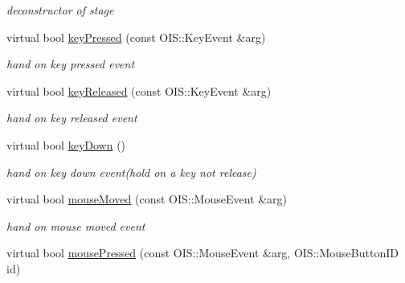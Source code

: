\begin{DoxyCompactItemize}
\begin{DoxyCompactList}\small\item\em deconstructor of stage \end{DoxyCompactList}\item 
\hypertarget{class_stage4_a4fc3efa617bb187f164423139d5501a6}{
virtual bool \hyperlink{class_stage4_a4fc3efa617bb187f164423139d5501a6}{keyPressed} (const OIS::KeyEvent \&arg)}
\label{class_stage4_a4fc3efa617bb187f164423139d5501a6}

\begin{DoxyCompactList}\small\item\em hand on key pressed event \end{DoxyCompactList}\item 
\hypertarget{class_stage4_a3bf5cfd207ce38f2c5d8d00e33f0b852}{
virtual bool \hyperlink{class_stage4_a3bf5cfd207ce38f2c5d8d00e33f0b852}{keyReleased} (const OIS::KeyEvent \&arg)}
\label{class_stage4_a3bf5cfd207ce38f2c5d8d00e33f0b852}

\begin{DoxyCompactList}\small\item\em hand on key released event \end{DoxyCompactList}\item 
\hypertarget{class_stage4_aa177dca3597334e6147693da5f825fb2}{
virtual bool \hyperlink{class_stage4_aa177dca3597334e6147693da5f825fb2}{keyDown} ()}
\label{class_stage4_aa177dca3597334e6147693da5f825fb2}

\begin{DoxyCompactList}\small\item\em hand on key down event(hold on a key not release) \end{DoxyCompactList}\item 
\hypertarget{class_stage4_acd5c7524763b3b8e32a359d680dbf4cc}{
virtual bool \hyperlink{class_stage4_acd5c7524763b3b8e32a359d680dbf4cc}{mouseMoved} (const OIS::MouseEvent \&arg)}
\label{class_stage4_acd5c7524763b3b8e32a359d680dbf4cc}

\begin{DoxyCompactList}\small\item\em hand on mouse moved event \end{DoxyCompactList}\item 
\hypertarget{class_stage4_a6ec6dbfb3e09a09f8f5a2f48e4f2f242}{
virtual bool \hyperlink{class_stage4_a6ec6dbfb3e09a09f8f5a2f48e4f2f242}{mousePressed} (const OIS::MouseEvent \&arg, OIS::MouseButtonID id)}
\label{class_stage4_a6ec6dbfb3e09a09f8f5a2f48e4f2f242}


\end{DoxyCompactItemize}
